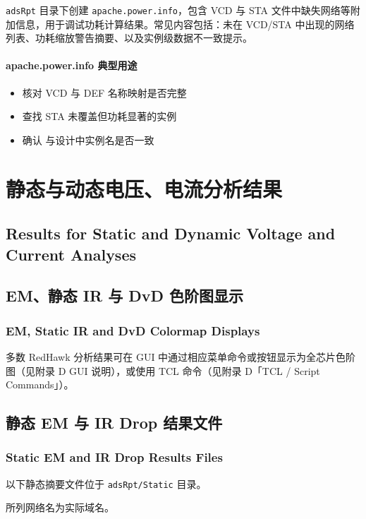 \texttt{adsRpt} 目录下创建 \texttt{apache.power.info}，包含 VCD 与 STA 文件中缺失网络等附加信息，用于调试功耗计算结果。常见内容包括：未在 VCD/STA 中出现的网络列表、功耗缩放警告摘要、以及实例级数据不一致提示。

\paragraph{apache.power.info 典型用途}
\begin{itemize}
  \item 核对 VCD 与 DEF 名称映射是否完整
  \item 查找 STA 未覆盖但功耗显著的实例
  \item 确认  与设计中实例名是否一致
\end{itemize}

\section{静态与动态电压、电流分析结果}
\subsection*{Results for Static and Dynamic Voltage and Current Analyses}

\subsection{EM、静态 IR 与 DvD 色阶图显示}
\subsubsection*{EM, Static IR and DvD Colormap Displays}

多数 RedHawk 分析结果可在 GUI 中通过相应菜单命令或按钮显示为全芯片色阶图（见附录 D GUI 说明），或使用 TCL  命令（见附录 D「TCL / Script Commands」）。

\subsection{静态 EM 与 IR Drop 结果文件}
\subsubsection*{Static EM and IR Drop Results Files}

以下静态摘要文件位于 \texttt{adsRpt/Static} 目录。
\begin{noteBox}
所列网络名为实际域名。
\end{noteBox}

